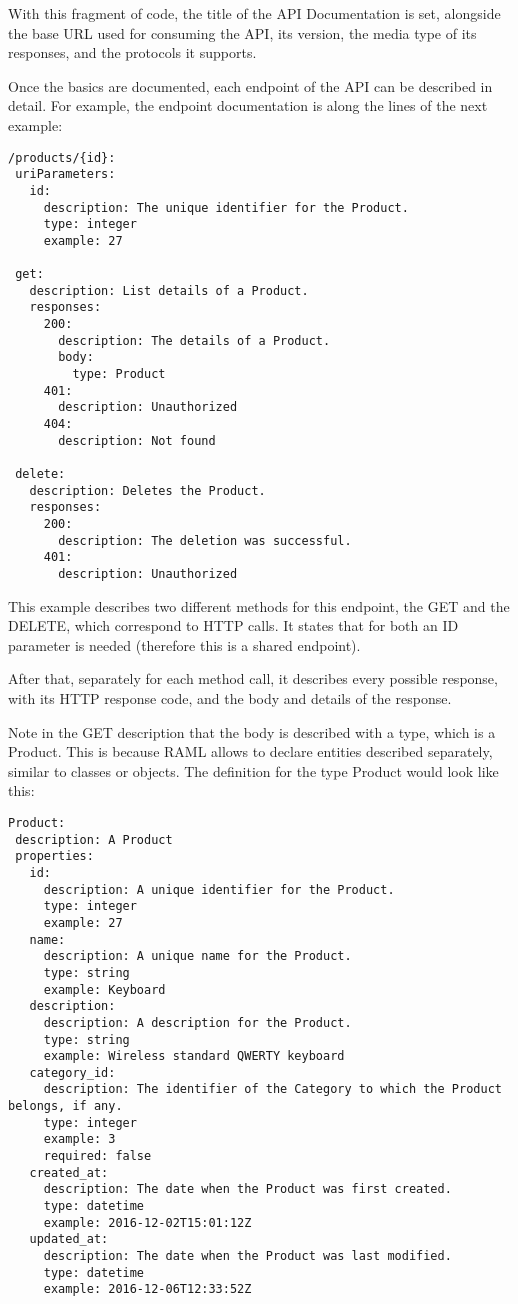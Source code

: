 With this fragment of code, the title of the API Documentation is set, alongside the base URL used for consuming the API, its version, the media type of its responses, and the protocols it supports.

Once the basics are documented, each endpoint of the API can be described in detail. For example, the  endpoint documentation is along the lines of the next example:

\begin{verbatim}
/products/{id}:
 uriParameters:
   id:
     description: The unique identifier for the Product.
     type: integer
     example: 27

 get:
   description: List details of a Product.
   responses:
     200:
       description: The details of a Product.
       body:
         type: Product
     401:
       description: Unauthorized
     404:
       description: Not found

 delete:
   description: Deletes the Product.
   responses:
     200:
       description: The deletion was successful.
     401:
       description: Unauthorized
\end{verbatim}

This example describes two different methods for this endpoint, the GET and the DELETE, which correspond to HTTP calls. It states that for both an ID parameter is needed (therefore this is a shared endpoint).

After that, separately for each method call, it describes every possible response, with its HTTP response code, and the body and details of the response.

Note in the GET description that the body is described with a type, which is a Product. This is because RAML allows to declare entities described separately, similar to classes or objects. The definition for the type Product would look like this:

\begin{verbatim}
Product:
 description: A Product
 properties:
   id:
     description: A unique identifier for the Product.
     type: integer
     example: 27
   name:
     description: A unique name for the Product.
     type: string
     example: Keyboard
   description:
     description: A description for the Product.
     type: string
     example: Wireless standard QWERTY keyboard
   category_id:
     description: The identifier of the Category to which the Product belongs, if any.
     type: integer
     example: 3
     required: false
   created_at:
     description: The date when the Product was first created.
     type: datetime
     example: 2016-12-02T15:01:12Z
   updated_at:
     description: The date when the Product was last modified.
     type: datetime
     example: 2016-12-06T12:33:52Z
\end{verbatim}

